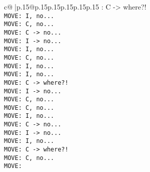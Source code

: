 \documentclass{article}
\begin{document}
{\begin{supertabular}{c@{$\;$}|p{.15\linewidth}@{}p{.15\linewidth}p{.15\linewidth}p{.15\linewidth}p{.15\linewidth}p{.15\linewidth}}
{{{: C -> where?!\\ \tt  MOVE: I, no...\\ \tt  MOVE: C, no...\\ \tt  MOVE: C -> no...\\ \tt  MOVE: I -> no...\\ \tt  MOVE: I, no...\\ \tt  MOVE: C, no...\\ \tt  MOVE: I, no...\\ \tt  MOVE: I, no...\\ \tt  MOVE: C -> where?!\\ \tt  MOVE: I -> no...\\ \tt  MOVE: C, no...\\ \tt  MOVE: C, no...\\ \tt  MOVE: I, no...\\ \tt  MOVE: C -> no...\\ \tt  MOVE: I -> no...\\ \tt  MOVE: I, no...\\ \tt  MOVE: C -> where?!\\ \tt  MOVE: C, no...\\ \tt  MOVE:}}}
\end{supertabular}}
\end{document}
